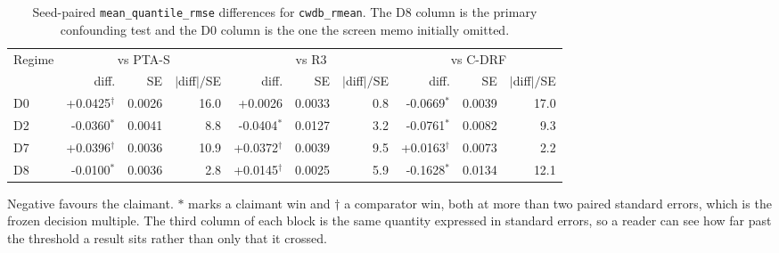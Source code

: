 \begin{table}[htbp]
\centering
\caption{Seed-paired \texttt{mean\_quantile\_rmse} differences for \texttt{cwdb\_rmean}. The D8 column is the primary confounding test and the D0 column is the one the screen memo initially omitted.}
\label{tab:p55-paired-rmean}
\scriptsize
\setlength{\tabcolsep}{4pt}
\begin{tabular}{@{}lrrrrrrrrr@{}}
\toprule
Regime & \multicolumn{3}{c}{vs PTA-S} & \multicolumn{3}{c}{vs R3} & \multicolumn{3}{c}{vs C-DRF} \\
  & diff. & SE & $|$diff$|/$SE & diff. & SE & $|$diff$|/$SE & diff. & SE & $|$diff$|/$SE \\
\midrule
D0 & +0.0425$^{\dagger}$ & 0.0026 & 16.0 & +0.0026 & 0.0033 & 0.8 & -0.0669$^{\ast}$ & 0.0039 & 17.0 \\
D2 & -0.0360$^{\ast}$ & 0.0041 & 8.8 & -0.0404$^{\ast}$ & 0.0127 & 3.2 & -0.0761$^{\ast}$ & 0.0082 & 9.3 \\
D7 & +0.0396$^{\dagger}$ & 0.0036 & 10.9 & +0.0372$^{\dagger}$ & 0.0039 & 9.5 & +0.0163$^{\dagger}$ & 0.0073 & 2.2 \\
D8 & -0.0100$^{\ast}$ & 0.0036 & 2.8 & +0.0145$^{\dagger}$ & 0.0025 & 5.9 & -0.1628$^{\ast}$ & 0.0134 & 12.1 \\
\bottomrule
\end{tabular}
\par\vspace{2pt}\parbox{0.96\textwidth}{\scriptsize Negative favours the claimant. $\ast$ marks a claimant win and $\dagger$ a comparator win, both at more than two paired standard errors, which is the frozen decision multiple. The third column of each block is the same quantity expressed in standard errors, so a reader can see how far past the threshold a result sits rather than only that it crossed.}
\end{table}

